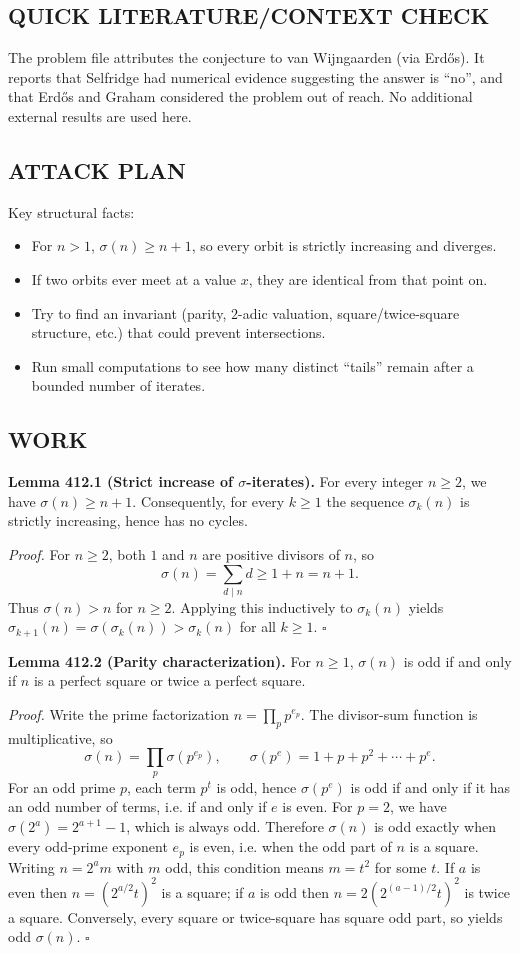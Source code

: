 \subsection*{QUICK LITERATURE/CONTEXT CHECK}
The problem file attributes the conjecture to van Wijngaarden (via Erd\H{o}s). It reports that Selfridge had numerical evidence suggesting the answer is ``no'', and that Erd\H{o}s and Graham considered the problem out of reach.
No additional external results are used here.

\subsection*{ATTACK PLAN}
Key structural facts:
\begin{itemize}
  \item For $n>1$, $\sigma(n)\ge n+1$, so every orbit is strictly increasing and diverges.
  \item If two orbits ever meet at a value $x$, they are identical from that point on.
  \item Try to find an invariant (parity, $2$-adic valuation, square/twice-square structure, etc.) that could prevent intersections.
  \item Run small computations to see how many distinct ``tails'' remain after a bounded number of iterates.
\end{itemize}

\subsection*{WORK}
\textbf{Lemma 412.1 (Strict increase of $\sigma$-iterates).}
For every integer $n\ge2$, we have $\sigma(n)\ge n+1$. Consequently, for every $k\ge1$ the sequence $\sigma_k(n)$ is strictly increasing, hence has no cycles.

\textit{Proof.}
For $n\ge2$, both $1$ and $n$ are positive divisors of $n$, so
$$\sigma(n)=\sum_{d\mid n} d \ge 1+n=n+1.$$
Thus $\sigma(n)>n$ for $n\ge2$.
Applying this inductively to $\sigma_k(n)$ yields $\sigma_{k+1}(n)=\sigma(\sigma_k(n))>\sigma_k(n)$ for all $k\ge1$.
\hfill$\square$

\textbf{Lemma 412.2 (Parity characterization).}
For $n\ge1$, $\sigma(n)$ is odd if and only if $n$ is a perfect square or twice a perfect square.

\textit{Proof.}
Write the prime factorization $n=\prod_p p^{e_p}$.
The divisor-sum function is multiplicative, so
$$\sigma(n)=\prod_p \sigma(p^{e_p}),\qquad \sigma(p^{e})=1+p+p^2+\cdots+p^e.$$
For an odd prime $p$, each term $p^t$ is odd, hence $\sigma(p^e)$ is odd if and only if it has an odd number of terms, i.e. if and only if $e$ is even.
For $p=2$, we have $\sigma(2^a)=2^{a+1}-1$, which is always odd.
Therefore $\sigma(n)$ is odd exactly when every odd-prime exponent $e_p$ is even, i.e. when the odd part of $n$ is a square.
Writing $n=2^a m$ with $m$ odd, this condition means $m=t^2$ for some $t$.
If $a$ is even then $n=(2^{a/2}t)^2$ is a square; if $a$ is odd then $n=2(2^{(a-1)/2}t)^2$ is twice a square.
Conversely, every square or twice-square has square odd part, so yields odd $\sigma(n)$.
\hfill$\square$

